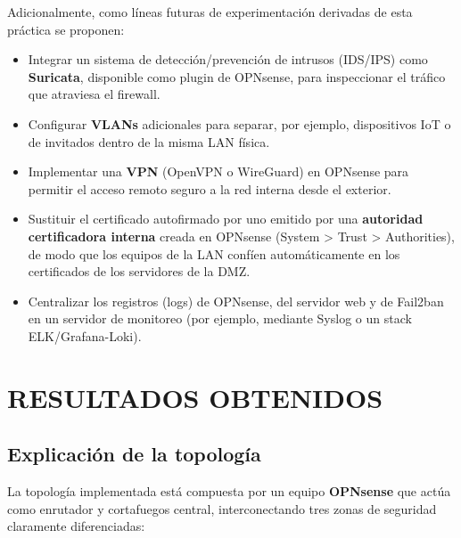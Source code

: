 \documentclass{article}
\providecommand{\tightlist}{%
  \setlength{\itemsep}{0pt}\setlength{\parskip}{0pt}}
\renewcommand{\_}{\oldunderscore\hskip0pt\relax}
\begin{document}
Adicionalmente, como líneas futuras de experimentación derivadas de esta
práctica se proponen:

\begin{itemize}
\tightlist
\item
  Integrar un sistema de detección/prevención de intrusos (IDS/IPS) como
  \textbf{Suricata}, disponible como plugin de OPNsense, para
  inspeccionar el tráfico que atraviesa el firewall.
\item
  Configurar \textbf{VLANs} adicionales para separar, por ejemplo,
  dispositivos IoT o de invitados dentro de la misma LAN física.
\item
  Implementar una \textbf{VPN} (OpenVPN o WireGuard) en OPNsense para
  permitir el acceso remoto seguro a la red interna desde el exterior.
\item
  Sustituir el certificado autofirmado por uno emitido por una
  \textbf{autoridad certificadora interna} creada en OPNsense (System
  \textgreater{} Trust \textgreater{} Authorities), de modo que los
  equipos de la LAN confíen automáticamente en los certificados de los
  servidores de la DMZ.
\item
  Centralizar los registros (logs) de OPNsense, del servidor web y de
  Fail2ban en un servidor de monitoreo (por ejemplo, mediante Syslog o
  un stack ELK/Grafana-Loki).
\end{itemize}

\hypertarget{resultados-obtenidos}{%
\section{RESULTADOS OBTENIDOS}\label{resultados-obtenidos}}

\hypertarget{explicaciuxf3n-de-la-topologuxeda}{%
\subsection{Explicación de la
topología}\label{explicaciuxf3n-de-la-topologuxeda}}

La topología implementada está compuesta por un equipo \textbf{OPNsense}
que actúa como enrutador y cortafuegos central, interconectando tres
zonas de seguridad claramente diferenciadas:
\end{document}
